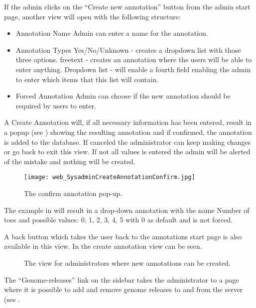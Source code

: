 If the admin clicks on the “Create new annotation” button from the admin start page, another view will open with the following structure:
\begin{itemize}
 \item Annotation Name
 \subitem Admin can enter a name for the annotation.
 
 \item Annotation Types
 \subitem Yes/No/Unknown - creates a dropdown list with those three options.
 \subitem freetext - creates an annotation where the users will be able to enter anything.
 \subitem Dropdown list - will enable a fourth field enabling the admin to enter which items that this list will contain.
 
 \item Forced Annotation
 \subitem Admin can choose if the new annotation should be required by users to enter. 
\end{itemize}

A Create Annotation will, if all necessary information has been entered, result in a popup (see ) showing the resulting annotation and if confirmed, the annotation is added to the database. 
If canceled the administrator can keep making changes or go back to exit this view. If not all values is entered the admin will be alerted of the mistake and nothing will be created.

\begin{figure}[h]
 \centering
 \texttt{[image: web\_SysadminCreateAnnotationConfirm.jpg]}
 \caption{The confirm annotation pop-up.}
 \label{adm_web_createPopup}
\end{figure}



The example in  will result in a drop-down annotation with the name Number of toes and possible values: 0, 1, 2, 3, 4, 5 with 0 as default and is not forced.

A back button which takes the user back to the annotations start page is also available in this view. In  the create annotation view can be seen.

\begin{figure}[t]
 \caption{The view for administrators where new annotations can be created.}
 \label{adm_web_createView}
\end{figure}

The “Genome-releases” link on the sidebar takes the administrator to a page where it is possible to add and remove genome releases to and from the server (see .

